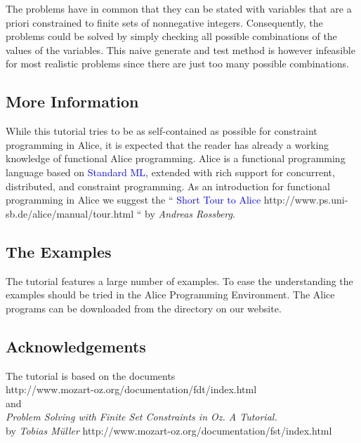 \documentclass[a4paper,halfparskip]{scrartcl}
\begin{document}
The problems have in common that they can be stated with variables 
that are a priori 
constrained to finite sets of nonnegative integers. Consequently, 
the problems could be 
solved by simply checking all possible combinations of the values 
of the variables. This naive 
generate and test method is however infeasible for most realistic 
problems since there are just 
too many possible combinations.


\subsection{More Information}

While this tutorial tries to be as self-contained as possible for 
constraint programming in Alice, 
it is expected that the reader has already a working knowledge of
functional Alice programming. Alice is a functional programming
language based on \textcolor{blue}{Standard ML}, extended with rich
support for concurrent, distributed, and constraint programming.
As an introduction for functional programming in Alice we suggest the 
\cite{4} ``\htmladdnormallink
{\textcolor{blue}{Short Tour to Alice}}
{http://www.ps.uni-sb.de/alice/manual/tour.html}
`` by \emph{Andreas Rossberg}.

\subsection{The Examples}

The tutorial features a large number of examples. To ease the 
understanding the examples should 
be tried in the Alice Programming Environment. The Alice 
programs can be downloaded from the 
directory on our website.

\subsection{Acknowledgements}

The tutorial is based on the documents\\
{http://www.mozart-oz.org/documentation/fdt/index.html} 
\\ 
and\\
\htmladdnormallink
{\cite{2} \emph{Problem Solving with 
Finite Set Constraints in Oz. A Tutorial.} \\
by \emph{Tobias M\"uller}}
{http://www.mozart-oz.org/documentation/fst/index.html}
\end{document}
